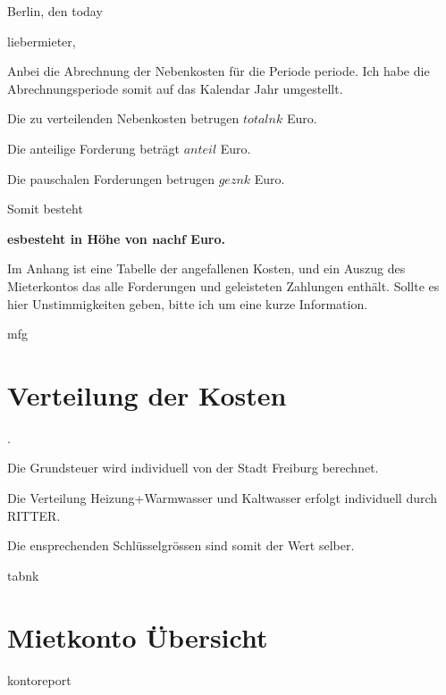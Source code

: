 \documentclass[12pt]{article}
\newcommand{\euro}{Euro}
\begin{document}
\hfill Berlin, den {{today}}

{{liebermieter}},

\bigskip

Anbei die Abrechnung der Nebenkosten für die Periode {{periode}}.
Ich habe die Abrechnungsperiode somit auf das Kalendar Jahr umgestellt.

Die zu verteilenden Nebenkosten betrugen ${{totalnk}}$ \euro.

Die anteilige Forderung beträgt ${{anteil}}$ \euro.

Die pauschalen Forderungen betrugen ${{geznk}}$ \euro. 

Somit besteht

\bigskip

\begin{centering}
{ \bf {{esbesteht}} in Höhe von ${\mathbf {{nachf}} }$ \euro.}
\end{centering}

\bigskip

Im Anhang ist eine Tabelle der angefallenen Kosten, und ein Auszug des 
Mieterkontos
das alle Forderungen und geleisteten Zahlungen enthält.
Sollte es hier Unstimmigkeiten geben, 
bitte ich um eine kurze Information.

\bigskip
\bigskip
\bigskip

{{mfg}}

\vfill
\eject

\section*{Verteilung der Kosten}. 

Die Grundsteuer wird individuell von der Stadt Freiburg berechnet.

Die Verteilung Heizung+Warmwasser und Kaltwasser erfolgt individuell durch RITTER. 

Die ensprechenden 
Schlüsselgrössen sind somit der Wert selber.

\bigskip
\bigskip
\bigskip
\bigskip


  {\small
\begin{centering}
{{ tabnk }}
\end{centering}
}

\vfill\eject

\section*{Mietkonto Übersicht}
{\small
\begin{centering}
{{ kontoreport }}
\end{centering}
}
\end{document}
